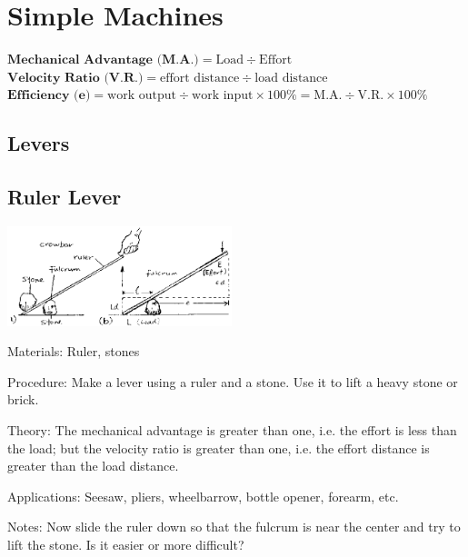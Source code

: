 \section{Simple Machines}

$\textbf{Mechanical Advantage (M.A.)} = \text{Load} \div \text{Effort}$\\
$\textbf{Velocity Ratio (V.R.)} = \text{effort distance} \div \text{load distance}$\\
$\textbf{Efficiency (e)} = \text{work output} \div \text{work input} \times 100\% = \text{M.A.} \div \text{V.R.} \times 100\% $\\

\begin{multicols}{2}


\section*{Levers}


\subsection{Ruler Lever}

\begin{center}
\includegraphics[width=0.49\textwidth]{./img/source/ruler-lever.png}
\end{center}

\begin{description*}
\item[Materials:]{Ruler, stones}
\item[Procedure:]{Make a lever using a ruler and a stone. Use it to lift a heavy stone or brick.}
\item[Theory:]{The mechanical advantage is greater than one, i.e. the effort is less than the load; but the velocity ratio is greater than one, i.e. the effort distance is greater than the load distance.}
\item[Applications:]{Seesaw, pliers, wheelbarrow, bottle opener, forearm, etc.}
\item[Notes:]{Now slide the ruler down so that the fulcrum is near the center and try to lift the stone. Is it easier or more difficult?}
\end{description*}


\end{multicols}
